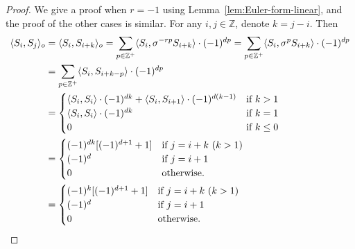 \documentclass[reqno,12pt,a4paper]{amsart}
\theoremstyle{remark}
\theoremstyle{definition}
\numberwithin{equation}{section}
\begin{document}
\begin{proof}
We give a proof when $r=-1$ using Lemma~\ref{lem:Euler-form-linear}, and the proof of the other cases is similar.
For any $i, j \in \mathbb{Z}$, denote $k=j-i$. Then
\begin{align*}
\langle S_i,S_j\rangle_o &=\langle S_{i},S_{i+k}\rangle_o=\sum_{p\in \mathbb{Z}^+}\langle S_i,\sigma^{-rp}S_{i+k}\rangle\cdot(-1)^{dp}=\sum_{p\in \mathbb{Z}^+}\langle S_i,\sigma^{p}S_{i+k}\rangle\cdot(-1)^{dp}\\
&=\sum_{p\in \mathbb{Z}^+}\langle S_i,S_{i+k-p}\rangle\cdot(-1)^{dp}\\
&=
\begin{cases}
    \langle S_i,S_{i}\rangle\cdot(-1)^{dk} +\langle S_i,S_{i+1}\rangle\cdot(-1)^{d(k-1)} & \text{if }k>1\\
    \langle S_i,S_{i}\rangle\cdot(-1)^{dk} & \text{if } k=1\\
    0 & \text{if } k\leq 0
    \end{cases}\\
    &=
\begin{cases}
    (-1)^{dk}[(-1)^{d+1}+1] & \text{if }j=i+k ~(k>1)\\
    (-1)^{d} & \text{if } j=i+1\\
    0 & \text{otherwise.}
    \end{cases}\\
&=
\begin{cases}
    (-1)^{k}[(-1)^{d+1}+1] & \text{if }j=i+k ~(k>1)\\
    (-1)^{d} & \text{if } j=i+1\\
    0 & \text{otherwise.}
    \end{cases}
\qedhere
\end{align*}
\end{proof}
\end{document}
